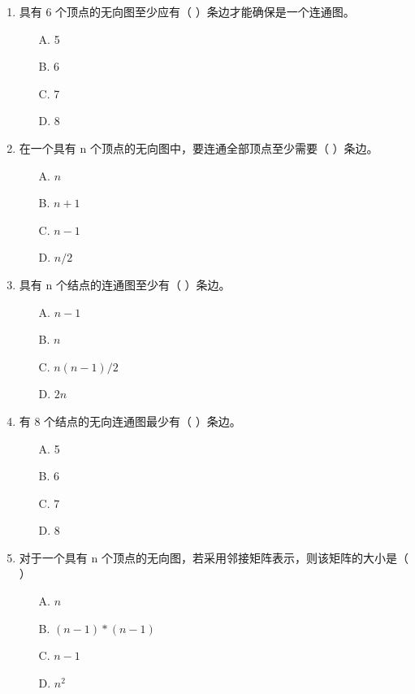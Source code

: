 \documentclass[12pt, a4paper]{article}
\begin{document}
\begin{enumerate}[label=\arabic*.]
	\item 具有 6 个顶点的无向图至少应有（ ）条边才能确保是一个连通图。
	      \begin{enumerate}
		      \item[A.] 5
		      \item[B.] 6
		      \item[C.] 7
		      \item[D.] 8
	      \end{enumerate}

	\item 在一个具有 n 个顶点的无向图中，要连通全部顶点至少需要（ ）条边。
	      \begin{enumerate}
		      \item[A.] $n$
		      \item[B.] $n+1$
		      \item[C.] $n-1$
		      \item[D.] $n/2$
	      \end{enumerate}

	\item 具有 n 个结点的连通图至少有（ ）条边。
	      \begin{enumerate}
		      \item[A.] $n-1$
		      \item[B.] $n$
		      \item[C.] $n(n-1)/2$
		      \item[D.] $2n$
	      \end{enumerate}

	\item 有 8 个结点的无向连通图最少有（ ）条边。
	      \begin{enumerate}
		      \item[A.] 5
		      \item[B.] 6
		      \item[C.] 7
		      \item[D.] 8
	      \end{enumerate}

	\item 对于一个具有 n 个顶点的无向图，若采用邻接矩阵表示，则该矩阵的大小是（ ）
	      \begin{enumerate}
		      \item[A.] $n$
		      \item[B.] $(n-1)*(n-1)$
		      \item[C.] $n-1$
		      \item[D.] $n^2$
	      \end{enumerate}


\end{enumerate}
\end{document}
